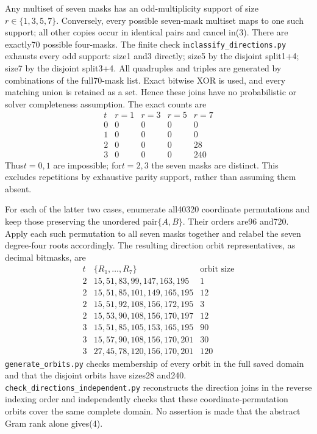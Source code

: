 \documentclass{article}
\begin{document}
Any multiset of seven masks has an odd-multiplicity support of size
$r\in\{1,3,5,7\}$. Conversely, every possible seven-mask multiset
maps to one such support; all other copies occur in identical pairs
and cancel in(3). There are exactly70 possible four-masks.
The finite check in\texttt{classify\_directions.py} exhausts every odd
support: size1 and3 directly; size5 by the disjoint split1+4;
size7 by the disjoint split3+4. All quadruples and triples are generated
by combinations of the full70-mask list. Exact bitwise XOR is used,
and every matching union is retained as a set. Hence these joins have
no probabilistic or solver completeness assumption. The exact counts are
\[
\begin{array}{c|rrrr}
t& r=1&r=3&r=5&r=7\\\hline
0&0&0&0&0\\1&0&0&0&0\\2&0&0&0&28\\3&0&0&0&240
\end{array}                                                   \tag{4}
\]
Thus$t=0,1$ are impossible; for$t=2,3$ the seven masks are distinct.
This excludes repetitions by exhaustive parity support, rather than
assuming them absent.

For each of the latter two cases, enumerate all40320 coordinate
permutations and keep those preserving the unordered pair$\{A,B\}$.
Their orders are96 and720. Apply each such permutation to all seven
masks together and relabel the seven degree-four roots accordingly.
The resulting direction orbit representatives, as decimal bitmasks,
are
\[
\begin{array}{c|l|r}
t&\{R_1,\ldots,R_7\}&\text{orbit size}\\\hline
2&15,51,83,99,147,163,195&1\\
2&15,51,85,101,149,165,195&12\\
2&15,51,92,108,156,172,195&3\\
2&15,53,90,108,156,170,197&12\\
3&15,51,85,105,153,165,195&90\\
3&15,57,90,108,156,170,201&30\\
3&27,45,78,120,156,170,201&120
\end{array}                                                    \tag{5}
\]
\texttt{generate\_orbits.py} checks membership of every orbit in the
full saved domain and that the disjoint orbits have sizes28 and240.
\texttt{check\_directions\_independent.py} reconstructs the direction
joins in the reverse indexing order and independently checks that
these coordinate-permutation orbits cover the same complete domain.
No assertion is made that the abstract Gram rank alone gives(4).
\end{document}
